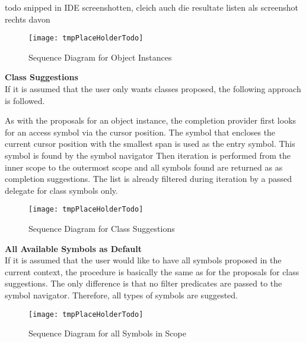 todo snipped in IDE screenshotten, cleich auch die resultate listen als screenshot rechts davon

\begin{figure}[H]
    \centering
    \texttt{[image: tmpPlaceHolderTodo]}
    \caption{Sequence Diagram for Object Instances}
    \label{fig:object_completion_diagram}
\end{figure}

\textbf{Class Suggestions}\\
If it is assumed that the user only wants classes proposed, the following approach is followed.

As with the proposals for an object instance,
the completion provider first looks for an access symbol via the cursor position.
The symbol that encloses the current cursor position with the smallest span is used as the entry symbol.
This symbol is found by the symbol navigator
Then iteration is performed from the inner scope
to the outermost scope and all symbols found are returned as as completion suggestions.
The list is already filtered during iteration by a passed delegate for class symbols only.



\begin{figure}[H]
    \centering
    \texttt{[image: tmpPlaceHolderTodo]}
    \caption{Sequence Diagram for Class Suggestions}
    \label{fig:new_completion_diagram}
\end{figure}

\textbf{All Available Symbols as Default}\\
If it is assumed that the user would like to have all symbols proposed in the current context,
the procedure is basically the same as for the proposals for class suggestions.
The only difference is that no filter predicates are passed to the symbol navigator. Therefore, all types of symbols are suggested.

\begin{figure}[H]
    \centering
    \texttt{[image: tmpPlaceHolderTodo]}
    \caption{Sequence Diagram for all Symbols in Scope}
    \label{fig:default_completion_diagram}
\end{figure}

